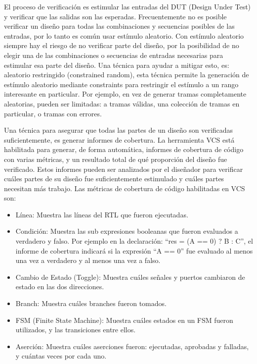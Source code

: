 \documentclass[a4paper, twoside, 11pt]{report}
\begin{document}
El proceso de verificación es estimular las entradas del DUT (Design Under Test) y verificar que las salidas son las esperadas. Frecuentemente no es posible verificar un diseño para todas las combinaciones y secuencias posibles de las entradas, por lo tanto es común usar estímulo aleatorio. Con estímulo aleatorio siempre hay el riesgo de no verificar parte del diseño, por la posibilidad de no elegir una de las combinaciones o secuencias de entradas necesarias para estimular esa parte del diseño. Una técnica para ayudar a mitigar esto, es: aleatorio restringido (constrained random), esta técnica permite la generación de estímulo aleatorio mediante constraints para restringir el estímulo a un rango interesante en particular. Por ejemplo, en vez de generar tramas completamente aleatorias, pueden ser limitadas: a tramas válidas, una colección de tramas en particular, o tramas con errores.

Una técnica para asegurar que todas las partes de un diseño son verificadas suficientemente, es generar informes de cobertura. La herramienta VCS está habilitada para generar, de forma automática, informes de cobertura de código con varias métricas, y un resultado total de qué proporción del diseño fue verificado. Estos informes pueden ser analizados por el diseñador para verificar cuáles partes de su diseño fue suficientemente estimulado y cuáles partes necesitan más trabajo. Las métricas de cobertura de código habilitadas en VCS son:

\begin{itemize}
  \item Línea: Muestra las líneas del RTL que fueron ejecutadas.
  \item Condición: Muestra las sub expresiones booleanas que fueron evaluados a verdadero y falso. Por ejemplo en la declaración: “res = (A == 0) ? B : C”, el informe de cobertura indicará si la expresión “A == 0” fue evaluado al menos una vez a verdadero y al menos una vez a falso.
  \item Cambio de Estado (Toggle): Muestra cuáles señales y puertos cambiaron de estado en las dos direcciones.
  \item Branch: Muestra cuáles branches fueron tomados.
  \item FSM (Finite State Machine): Muestra cuáles estados en un FSM fueron utilizados, y las transiciones entre ellos.
  \item Aserción: Muestra cuáles aserciones fueron: ejecutadas, aprobadas y falladas, y cuántas veces por cada uno.
\end{itemize}
\end{document}
